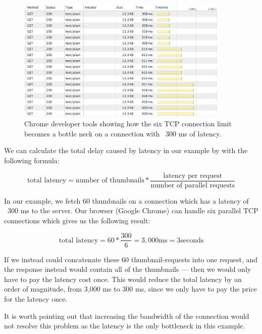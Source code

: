 \documentclass{cslthse-msc}
\begin{document}
\begin{figure}[H]
  \centering
    \begin{center}
      \includegraphics[width=0.9\textwidth]{images/chrome_latency_limit.png}
    \end{center}
  \caption{Chrome developer tools showing how the six TCP connection limit becomes a bottle neck on a connection with ~300 ms of latency.}
  \label{fig:tcp_bottleneck}
\end{figure}

We can calculate the total delay caused by latency in our example by with the following formula:

\begin{equation}
\mbox{total latency} = \mbox{number of thumbnails} * \frac{\mbox{latency per request}}{\mbox{number of parallel requests}}
\end{equation}

In our example, we fetch 60 thumbnails on a connection which has a latency of ~300 ms to the server. Our browser (Google Chrome) can handle six parallel TCP connections which gives us the following result:

\begin{equation}
\mbox{total latency} = 60 * \frac{300}{6} = 3,000 \mbox{ms} = 3 \mbox{seconds}
\end{equation}

If we instead could concatenate these 60 thumbnail-requests into one request, and the response instead would contain all of the thumbnails --- then we would only have to pay the latency cost once. This would reduce the total latency by an order of magnitude, from 3,000 ms to 300 ms, since we only have to pay the price for the latency once.

It is worth pointing out that increasing the bandwidth of the connection would not resolve this problem as the latency is the only bottleneck in this example.
\end{document}
